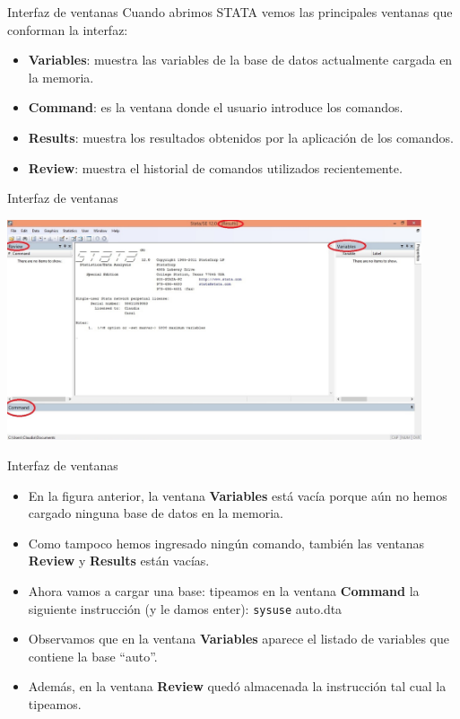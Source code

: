 \documentclass{beamer}
\begin{document}
\begin{frame}{Interfaz de ventanas}
Cuando abrimos STATA vemos las principales ventanas que conforman la interfaz:
\begin{itemize}
\item \textbf{Variables}: muestra las variables de la base de datos actualmente cargada en la memoria.
\item  \textbf{Command}: es la ventana donde el usuario introduce los comandos.
\item \textbf{Results}: muestra los resultados obtenidos por la aplicación de los comandos.
\item \textbf{Review}: muestra el historial de comandos utilizados recientemente.
\end{itemize}
\end{frame}

\begin{frame}{Interfaz de ventanas}
\centerline{\includegraphics[height=6.5cm]{Ventanas.jpg}}
\end{frame}

\begin{frame}{Interfaz de ventanas}
\begin{itemize}
\item En la figura anterior, la ventana \textbf{Variables} está vacía porque aún no hemos cargado ninguna base de datos en la memoria.
\item Como tampoco hemos ingresado ningún comando, también las ventanas \textbf{Review} y \textbf{Results} están vacías.
\item Ahora vamos a cargar una base: tipeamos en la ventana \textbf{Command} la siguiente instrucción (y le damos enter): \texttt{sysuse} auto.dta 
\item Observamos que en la ventana \textbf{Variables} aparece el listado de variables que contiene la base ``auto''.
\item Además, en la ventana \textbf{Review} quedó almacenada la instrucción tal cual la tipeamos.
\end{itemize}
\end{frame}
\end{document}
